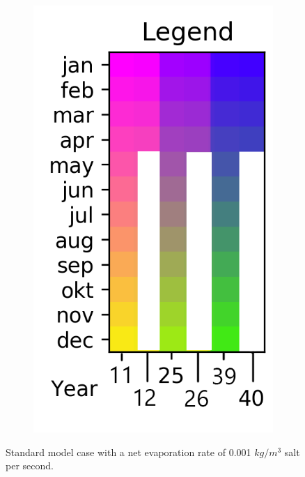 \documentclass[twocolumn]{article}
\begin{document}
\begin{figure}
\begin{subfigure}[h]{0.20\textwidth}
\includegraphics[width=\linewidth,keepaspectratio]{40yr_reduced_Legend.png}
\end{subfigure}\hfill
\caption{Standard model case with a net evaporation rate of 0.001 $kg/m^3$ salt per second.}
\label{fig:net_evap}
\end{figure}
\end{document}

